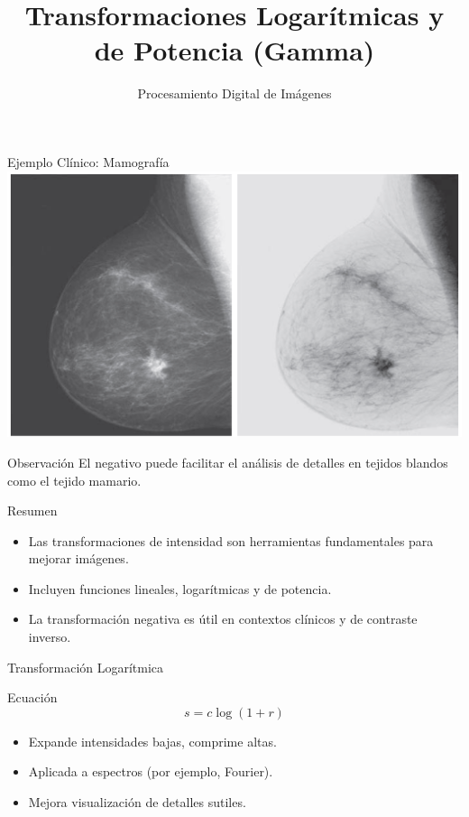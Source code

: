 \documentclass{beamer}
\begin{document}
\begin{frame}{Ejemplo Clínico: Mamografía}
\centering
\includegraphics[width=0.6\linewidth]{figuras/Fig_3_4.png}
\begin{block}{Observación}
El negativo puede facilitar el análisis de detalles en tejidos blandos como el tejido mamario.
\end{block}
\end{frame}

\begin{frame}{Resumen}
\begin{itemize}
    \item Las transformaciones de intensidad son herramientas fundamentales para mejorar imágenes.
    \item Incluyen funciones lineales, logarítmicas y de potencia.
    \item La transformación negativa es útil en contextos clínicos y de contraste inverso.
\end{itemize}
\end{frame}


\title{Transformaciones Logar\'itmicas y de Potencia (Gamma)}
\author{Procesamiento Digital de Im\'agenes}
\date{}

\begin{frame}
  \titlepage
\end{frame}

\begin{frame}{Transformación Logar\'itmica}
\begin{block}{Ecuaci\'on}
\[
s = c \log(1 + r) \tag{3-4}
\]
\end{block}
\begin{itemize}
    \item Expande intensidades bajas, comprime altas.
    \item Aplicada a espectros (por ejemplo, Fourier).
    \item Mejora visualizaci\'on de detalles sutiles.
\end{itemize}
\end{frame}
\end{document}
